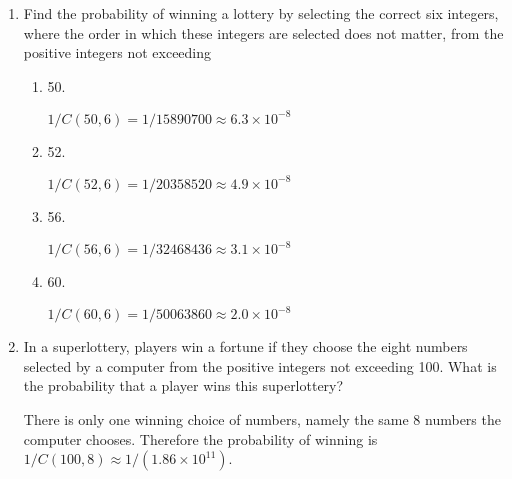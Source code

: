 \documentclass[11pt]{article}
\begin{document}
\begin{enumerate}[label=\textbf{\arabic*.}]
	\item Find the probability of winning a lottery by selecting the correct six integers, where the order in which these integers are selected does not matter, from the positive integers not exceeding
	
	\begin{enumerate}[label=\textbf{\alph*)}]
		\item 50.
		
		$1 / C(50, 6) = 1 / 15890700 \approx 6.3 \times 10^{-8}$
		
		\item 52.
		
		$1 / C(52, 6) = 1 / 20358520 \approx 4.9 \times 10^{-8}$
		
		\item 56.
		
		$1 / C(56, 6) = 1 / 32468436 \approx 3.1 \times 10^{-8}$
		
		\item 60.
		
		$1 / C(60, 6) = 1 / 50063860 \approx 2.0 \times 10^{-8}$
	\end{enumerate}

	\item In a superlottery, players win a fortune if they choose the eight numbers selected by a computer from the positive integers not exceeding 100. What is the probability that a player wins this superlottery?
	
	There is only one winning choice of numbers, namely the same 8 numbers the computer chooses. Therefore the probability of winning is $1 / C(100, 8) \approx 1 / (1.86 \times 10^{11})$.
\end{enumerate}
\end{document}
